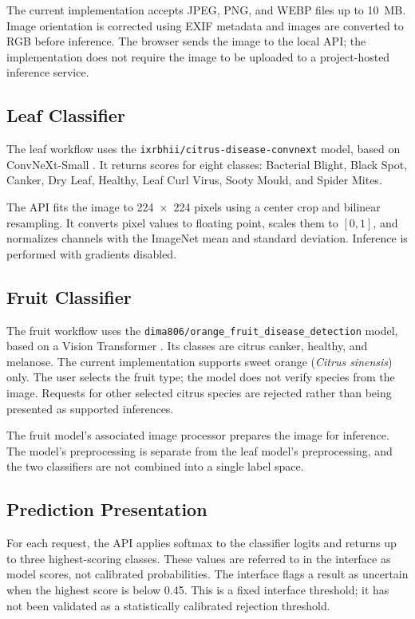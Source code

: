 \documentclass[conference]{IEEEtran}
\begin{document}
The current implementation accepts JPEG, PNG, and WEBP files up to 10~MB. Image orientation is corrected using EXIF metadata and images are converted to RGB before inference. The browser sends the image to the local API; the implementation does not require the image to be uploaded to a project-hosted inference service.

\subsection{Leaf Classifier}
The leaf workflow uses the \texttt{ixrbhii/citrus-disease-convnext} model, based on ConvNeXt-Small \cite{ixrmodel}. It returns scores for eight classes: Bacterial Blight, Black Spot, Canker, Dry Leaf, Healthy, Leaf Curl Virus, Sooty Mould, and Spider Mites.

The API fits the image to 224~$\times$~224 pixels using a center crop and bilinear resampling. It converts pixel values to floating point, scales them to $[0,1]$, and normalizes channels with the ImageNet mean and standard deviation. Inference is performed with gradients disabled.

\subsection{Fruit Classifier}
The fruit workflow uses the \texttt{dima806/orange\_fruit\_disease\_detection} model, based on a Vision Transformer \cite{dima806model}. Its classes are citrus canker, healthy, and melanose. The current implementation supports sweet orange (\emph{Citrus sinensis}) only. The user selects the fruit type; the model does not verify species from the image. Requests for other selected citrus species are rejected rather than being presented as supported inferences.

The fruit model's associated image processor prepares the image for inference. The model's preprocessing is separate from the leaf model's preprocessing, and the two classifiers are not combined into a single label space.

\subsection{Prediction Presentation}
For each request, the API applies softmax to the classifier logits and returns up to three highest-scoring classes. These values are referred to in the interface as model scores, not calibrated probabilities. The interface flags a result as uncertain when the highest score is below 0.45. This is a fixed interface threshold; it has not been validated as a statistically calibrated rejection threshold.
\end{document}
